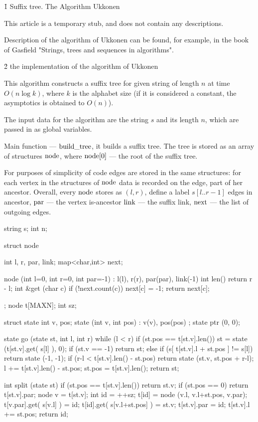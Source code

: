 \h1{ Suffix tree. The Algorithm Ukkonen }

This article is a temporary stub, and does not contain any descriptions.

Description of the algorithm of Ukkonen can be found, for example, in the book of Gasfield "Strings, trees and sequences in algorithms".


\h2{ the implementation of the algorithm of Ukkonen }

This algorithm constructs a suffix tree for given string of length $n$ at time $O (n \log k)$, where $k$ is the alphabet size (if it is considered a constant, the asymptotics is obtained to $O (n)$).

The input data for the algorithm are the string $s$ and its length $n$, which are passed in as global variables.

Main function --- $\rm build\_tree$, it builds a suffix tree. The tree is stored as an array of structures $\rm node$, where ${\rm node}[0]$ --- the root of the suffix tree.

For purposes of simplicity of code edges are stored in the same structures: for each vertex in the structures of $\rm node$ data is recorded on the edge, part of her ancestor. Overall, every $\rm node$ stores as $(l,r)$, define a label $s[l..r-1]$ edges in ancestor, $\rm par$ --- the vertex is-ancestor $\rm link$ --- the suffix link, $\rm next$ --- the list of outgoing edges.

\code
string s;
int n;

struct node {
int l, r, par, link;
map<char,int> next;

node (int l=0, int r=0, int par=-1)
: l(l), r(r), par(par), link(-1) {}
int len() { return r - l; }
int &get (char c) {
if (!next.count(c)) next[c] = -1;
return next[c];
}
};
node t[MAXN];
int sz;

struct state {
int v, pos;
state (int v, int pos) : v(v), pos(pos) {}
};
state ptr (0, 0);

state go (state st, int l, int r) {
while (l < r)
if (st.pos == t[st.v].len()) {
st = state (t[st.v].get( s[l] ), 0);
if (st.v == -1) return st;
}
else {
if (s[ t[st.v].l + st.pos ] != s[l])
return state (-1, -1);
if (r-l < t[st.v].len() - st.pos)
return state (st.v, st.pos + r-l);
l += t[st.v].len() - st.pos;
st.pos = t[st.v].len();
}
return st;
}

int split (state st) {
if (st.pos == t[st.v].len())
return st.v;
if (st.pos == 0)
return t[st.v].par;
node v = t[st.v];
int id = ++sz;
t[id] = node (v.l, v.l+st.pos, v.par);
t[v.par].get( s[v.l] ) = id;
t[id].get( s[v.l+st.pos] ) = st.v;
t[st.v].par = id;
t[st.v].l += st.pos;
return id;
}

